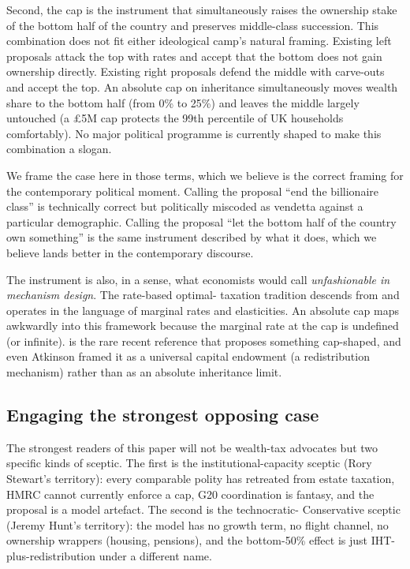 \documentclass[11pt]{article}
\begin{document}
Second, the cap is the instrument that simultaneously raises the
ownership stake of the bottom half of the country and preserves
middle-class succession.  This combination does not fit either
ideological camp's natural framing.  Existing left proposals
attack the top with rates and accept that the bottom does not
gain ownership directly.  Existing right proposals defend the
middle with carve-outs and accept the top.  An absolute cap on
inheritance simultaneously moves wealth share to the bottom half
(from 0\% to 25\%) and leaves the middle largely untouched (a
\pounds 5M cap protects the 99th percentile of UK households
comfortably).  No major political programme is currently shaped to
make this combination a slogan.

We frame the case here in those terms, which we believe is the
correct framing for the contemporary political moment.  Calling
the proposal ``end the billionaire class'' is technically correct
but politically miscoded as vendetta against a particular
demographic.  Calling the proposal ``let the bottom half of the
country own something'' is the same instrument described by what
it does, which we believe lands better in the contemporary
discourse.

The instrument is also, in a sense, what economists would call
\emph{unfashionable in mechanism design}.  The rate-based optimal-
taxation tradition descends from
\citet{piketty2013theory, farhi2010progressive, saez2018social}
and operates in the language of marginal rates and elasticities.
An absolute cap maps awkwardly into this framework because the
marginal rate at the cap is undefined (or infinite).
\citet{atkinson2015inequality} is the rare recent reference that
proposes something cap-shaped, and even Atkinson framed it as a
universal capital endowment (a redistribution mechanism) rather
than as an absolute inheritance limit.

\subsection{Engaging the strongest opposing case}

The strongest readers of this paper will not be wealth-tax
advocates but two specific kinds of sceptic.  The first is the
institutional-capacity sceptic (Rory Stewart's territory): every
comparable polity has retreated from estate taxation, HMRC cannot
currently enforce a cap, G20 coordination is fantasy, and the
proposal is a model artefact.  The second is the technocratic-
Conservative sceptic (Jeremy Hunt's territory): the model has no
growth term, no flight channel, no ownership wrappers (housing,
pensions), and the bottom-50\% effect is just IHT-plus-redistribution
under a different name.
\end{document}

